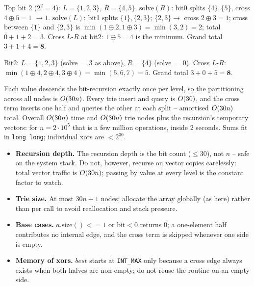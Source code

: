 \begin{tracebox}
Top bit \(2\) (\(2^2=4\)): \(L=\{1,2,3\}\), \(R=\{4,5\}\).
\(\mathrm{solve}(R)\): bit0 splits \(\{4\},\{5\}\), cross \(4\oplus5=1\) \(\to 1\).
\(\mathrm{solve}(L)\): bit1 splits \(\{1\},\{2,3\}\); \(\{2,3\}\to\) cross
\(2\oplus3=1\); cross between \(\{1\}\) and \(\{2,3\}\) is \(\min(1\oplus2,1\oplus3)
=\min(3,2)=2\); total \(0+1+2=3\).  Cross \(L\)-\(R\) at bit2: \(1\oplus5=4\) is the
minimum.  Grand total \(3+1+4=\mathbf{8}\).
\end{tracebox}
\begin{tracebox}
Bit2: \(L=\{1,2,3\}\) (solve \(=3\) as above), \(R=\{4\}\) (solve \(=0\)).  Cross
\(L\)-\(R\): \(\min(1\oplus4,2\oplus4,3\oplus4)=\min(5,6,7)=5\).  Grand total
\(3+0+5=\mathbf{8}\).
\end{tracebox}

\begin{complexitybox}
Each value descends the bit-recursion exactly once per level, so the partitioning
across all nodes is \(O(30n)\).  Every trie insert and query is \(O(30)\),
and the cross term inserts one half and queries the other at each split --
amortised \(O(30n)\) total.  Overall \(O(30n)\) time and \(O(30n)\)
trie nodes plus the recursion's temporary vectors: for \(n=2\cdot10^5\) that is
a few million operations, inside 2 seconds.  Sums fit in \texttt{long long};
individual xors are \(<2^{30}\).
\end{complexitybox}

\begin{hardeningbox}
\begin{itemize}[nosep,leftmargin=1.4em]
\item \textbf{Recursion depth.}  The recursion depth is the bit count (\(\le 30\)),
      not \(n\) -- safe on the system stack.  Do not, however, recurse on vector
      copies carelessly: total vector traffic is \(O(30n)\); passing by value at
      every level is the constant factor to watch.
\item \textbf{Trie size.}  At most \(30n+1\) nodes; allocate the array globally (as
      here) rather than per call to avoid reallocation and stack pressure.
\item \textbf{Base cases.}  \(a.\mathrm{size()}<=1\) or \(\text{bit}<0\) returns
      \(0\); a one-element half contributes no internal edge, and the cross term is
      skipped whenever one side is empty.
\item \textbf{Memory of xors.}  \(\mathit{best}\) starts at \texttt{INT\_MAX} only
      because a cross edge always exists when both halves are non-empty; do not
      reuse the routine on an empty side.
\end{itemize}
\end{hardeningbox}

